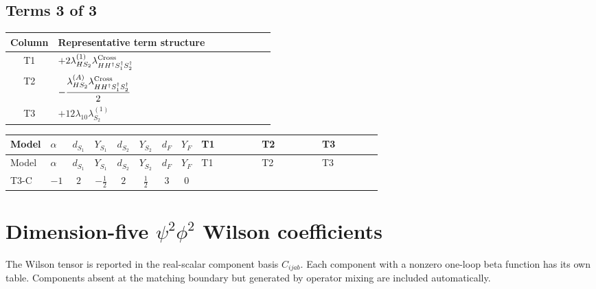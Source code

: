 \documentclass[8pt]{article}
\begin{document}
\begin{landscape}
\subsection*{Terms 3 of 3}
\begin{center}
\begin{tabular}{@{}c >{\raggedright\arraybackslash}p{0.82\linewidth}@{}}
\toprule
Column & Representative term structure \\
\midrule
T1 & \(\displaystyle +2 {\lambda_{HS_2}^{(1)}} {\lambda_{H H^\dagger S_1^\dagger S_2^\dagger}^{\rm Cross}}\) \\
\midrule
T2 & \(\displaystyle -\frac{{\lambda_{HS_2}^{(A)}} {\lambda_{H H^\dagger S_1^\dagger S_2^\dagger}^{\rm Cross}}}{2}\) \\
\midrule
T3 & \(\displaystyle +12 {\lambda_{10}} {\lambda_{S_2}^{(1)}}\) \\
\midrule
\bottomrule
\end{tabular}
\end{center}
\smallskip
\tiny
\begin{longtable}{@{}llcccccc >{\raggedright\arraybackslash}p{0.21\linewidth} >{\raggedright\arraybackslash}p{0.21\linewidth} >{\raggedright\arraybackslash}p{0.21\linewidth}@{}}
\toprule
Model & $\alpha$ & $d_{S_1}$ & $Y_{S_1}$ & $d_{S_2}$ & $Y_{S_2}$ & $d_F$ & $Y_F$ & T1 & T2 & T3 \\
\midrule
\endfirsthead
\toprule
Model & $\alpha$ & $d_{S_1}$ & $Y_{S_1}$ & $d_{S_2}$ & $Y_{S_2}$ & $d_F$ & $Y_F$ & T1 & T2 & T3 \\
\midrule
\endhead
T3-C & $-1$ & $2$ & $-\frac{1}{2}$ & $2$ & $\frac{1}{2}$ & $3$ & $0$ & \scriptsize\adjustbox{max width=\linewidth}{$\begin{gathered} +2 {\lambda_{HS_2}^{(1)}} {\lambda_{H H^\dagger S_1^\dagger S_2^\dagger}^{\rm Cross}}\end{gathered}$} & \scriptsize\adjustbox{max width=\linewidth}{$\begin{gathered} -\frac{{\lambda_{HS_2}^{(A)}} {\lambda_{H H^\dagger S_1^\dagger S_2^\dagger}^{\rm Cross}}}{2}\end{gathered}$} & \scriptsize\adjustbox{max width=\linewidth}{$\begin{gathered} +12 {\lambda_{10}} {\lambda_{S_2}^{(1)}}\end{gathered}$} \\
\midrule
\bottomrule
\end{longtable}
\clearpage
\section*{Dimension-five $\psi^2\phi^2$ Wilson coefficients}
The Wilson tensor is reported in the real-scalar component basis $C_{ijab}$. Each component with a nonzero one-loop beta function has its own table. Components absent at the matching boundary but generated by operator mixing are included automatically.

\end{landscape}
\end{document}
